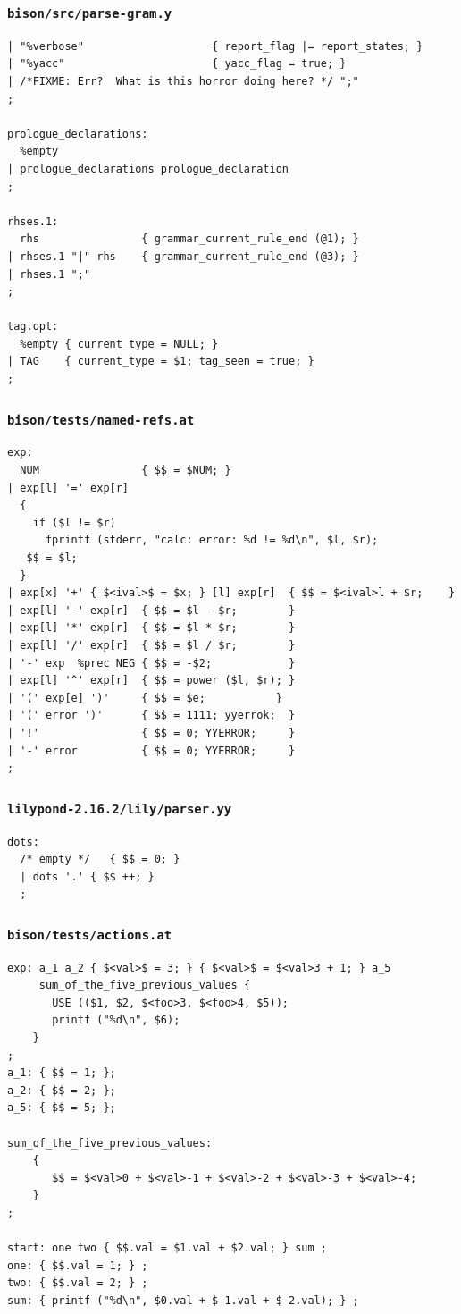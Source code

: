 \documentclass{beamer}
\begin{document}
\begin{frame}[fragile,shrink=25]
  \frametitle{\texttt{bison/src/parse-gram.y}}
\begin{verbatim}
| "%verbose"                    { report_flag |= report_states; }
| "%yacc"                       { yacc_flag = true; }
| /*FIXME: Err?  What is this horror doing here? */ ";"
;

prologue_declarations:
  %empty
| prologue_declarations prologue_declaration
;

rhses.1:
  rhs                { grammar_current_rule_end (@1); }
| rhses.1 "|" rhs    { grammar_current_rule_end (@3); }
| rhses.1 ";"
;

tag.opt:
  %empty { current_type = NULL; }
| TAG    { current_type = $1; tag_seen = true; }
;
\end{verbatim}
\end{frame}

\begin{frame}[fragile,shrink=25]
  \frametitle{\texttt{bison/tests/named-refs.at}}
\begin{verbatim}
exp:
  NUM                { $$ = $NUM; }
| exp[l] '=' exp[r]
  {
    if ($l != $r)
      fprintf (stderr, "calc: error: %d != %d\n", $l, $r);
   $$ = $l;
  }
| exp[x] '+' { $<ival>$ = $x; } [l] exp[r]  { $$ = $<ival>l + $r;    }
| exp[l] '-' exp[r]  { $$ = $l - $r;        }
| exp[l] '*' exp[r]  { $$ = $l * $r;        }
| exp[l] '/' exp[r]  { $$ = $l / $r;        }
| '-' exp  %prec NEG { $$ = -$2;            }
| exp[l] '^' exp[r]  { $$ = power ($l, $r); }
| '(' exp[e] ')'     { $$ = $e;           }
| '(' error ')'      { $$ = 1111; yyerrok;  }
| '!'                { $$ = 0; YYERROR;     }
| '-' error          { $$ = 0; YYERROR;     }
;
\end{verbatim}
\end{frame}

\begin{frame}[fragile,shrink=25]
  \frametitle{\texttt{lilypond-2.16.2/lily/parser.yy}}
\begin{verbatim}
dots:
  /* empty */   { $$ = 0; }
  | dots '.' { $$ ++; }
  ;
\end{verbatim}
\end{frame}

\begin{frame}[fragile,shrink=25]
  \frametitle{\texttt{bison/tests/actions.at}}
\begin{verbatim}
exp: a_1 a_2 { $<val>$ = 3; } { $<val>$ = $<val>3 + 1; } a_5
     sum_of_the_five_previous_values {
       USE (($1, $2, $<foo>3, $<foo>4, $5));
       printf ("%d\n", $6);
    }
;
a_1: { $$ = 1; };
a_2: { $$ = 2; };
a_5: { $$ = 5; };

sum_of_the_five_previous_values:
    {
       $$ = $<val>0 + $<val>-1 + $<val>-2 + $<val>-3 + $<val>-4;
    }
;

start: one two { $$.val = $1.val + $2.val; } sum ;
one: { $$.val = 1; } ;
two: { $$.val = 2; } ;
sum: { printf ("%d\n", $0.val + $-1.val + $-2.val); } ;
\end{verbatim}
\end{frame}
\end{document}
